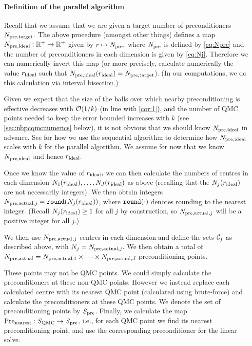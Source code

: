     \paragraph{Definition of the parallel algorithm} Recall that we assume that we are given a target number of preconditioners $N_{\mathrm{pre,target}}$. The above procedure (amongst other things) defines a map $N_{\mathrm{pre,ideal}}:\mathbb R^{+} \rightarrow \mathbb R^{+}$ given by $r \mapsto N_{\mathrm{pre}},$ where $N_{\mathrm{pre}}$ is defined by \cref{eq:Npre} and the number of preconditioners in each dimension is given by \cref{eq:Nj}.  Therefore we can numerically invert this map (or more precisely, calculate numerically the value $r_{\mathrm{ideal}}$ such that $N_{\mathrm{pre,ideal}}(r_{\mathrm{ideal}}) = N_{\mathrm{pre,target}}$). (In our computations, we do this calculation via interval bisection.)

Given we expect that the size of the balls over which nearby preconditioning is effective decreases with $\cO\mleft(1/k\mright)$ (in line with \cref{cor:1}), and the number of QMC points needed to keep the error bounded increases with $k$ (see \cref{sec:nbpcqmcnumerics} below), it is not obvious that we should know $N_{\mathrm{pre,ideal}}$ in advance. See  for how we use the sequential algorithm to determine how $N_{\mathrm{pre,ideal}}$ scales with $k$ for the parallel algorithm. We assume for now that we know $N_{\mathrm{pre,ideal}}$ and hence $r_{\mathrm{ideal}}.$

    Once we know the value of $r_{\mathrm{ideal}},$ we can then calculate the numbers of centres in each dimension $N_{1}(r_{\mathrm{ideal}}),\ldots,N_{J}(r_{\mathrm{ideal}})$ as above (recalling that the $N_{j}(r_{\mathrm{ideal}})$ are not necessarily integers). We then obtain integers $\Npreactualj = \round{\Nj(\rideal)}$, where $\round{\cdot}$ denotes rounding to the nearest integer. (Recall $N_{j}(r_{\mathrm{ideal}}) \geq 1$ for all $j$ by construction, so $N_{\mathrm{pre,actual},j}$ will be a positive integer for all $j.$)

We then use $N_{\mathrm{pre,actual},j}$ centres in each dimension and define the sets $\mathcal C_{j}$  as described above, with $N_{j} = N_{\mathrm{pre,actual},j}$. We then obtain a total of $N_{\mathrm{pre,actual}} = N_{\mathrm{pre,actual},1} \times \cdots \times N_{\mathrm{pre,actual},J}$ preconditioning points.

These points may not be QMC points. We could simply calculate the preconditioners at these non-QMC points. However we instead replace each calculated centre with its nearest QMC point (calculated using brute-force) and calculate the preconditioners at these QMC points. We denote the set of preconditioning points by $S_{\mathrm{pre}}$. Finally, we calculate the map $\mathrm{Pre}_{\mathrm{nearest}}:S_{\mathrm{QMC}}\rightarrow S_{\mathrm{pre}}$, i.e., for each QMC point we find its nearest preconditioning point, and use the corresponding preconditioner for the linear solve.

